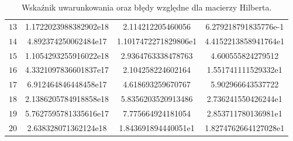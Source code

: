 \documentclass{classrep}
\begin{document}
\begin{table}[!h]
\begin{tabular}{l|S|S|S}
	 			$13$ & 1.1722023988382902e18 & 2.114212205460056 & 6.279218791835776e-1 \\ 
	 			$14$ & 4.892374250062484e17 & 1.1017472271829806e1 & 4.4152213858941764e1 \\
	 			$15$ & 1.1054293255916022e18 & 2.9364763338478763 & 4.600555824279512 \\
	 			$16$ & 4.3321097836601837e17 & 2.104258224602164 & 1.551741111529332e1 \\ 
	 			$17$ & 6.912464846448458e17 & 4.618693259670767 & 5.902966643537722 \\
	 			$18$ & 2.1386205784918858e18 & 5.8356203520913486 & 2.736241550426244e1\\ 
	 			$19$ & 5.7627595781335616e17 & 7.775664924181054 & 2.853711780136981e1 \\
	 			$20$ & 2.638328071362124e18  & 1.843691894440051e1 & 1.8274762664127028e1 \\ \bottomrule
	 		\end{tabular}
	 		\caption{Wskaźnik uwarunkowania oraz błędy względne dla macierzy Hilberta.}
			\label{table:2}
		\end{table}	
		
\end{document}
